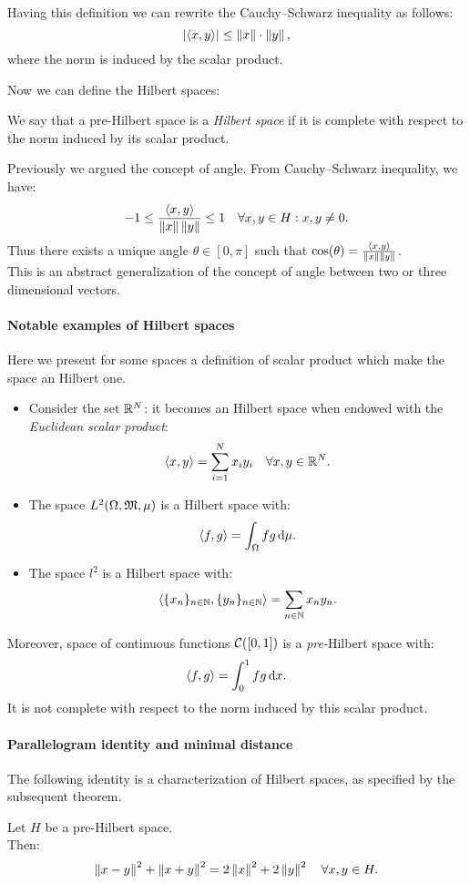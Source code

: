 Having this definition we can rewrite the Cauchy--Schwarz inequality as follows:
$$
\left\lvert \left\langle x,y\right\rangle \right\rvert
\leq \left\lVert x\right\rVert \cdot \left\lVert y\right\rVert
,
$$
where the norm is induced by the scalar product.

Now we can define the Hilbert spaces:

\begin{defn}\label{defn-hilbert-spaces}
	We say that a pre-Hilbert space is a \emph{Hilbert space} if it is complete with respect to the norm induced by its scalar product.
\end{defn}

Previously we argued the concept of angle. From Cauchy--Schwarz inequality, we have:
$$-1 \leq \frac{\left\langle x, y\right\rangle}{\left\lVert x\right\rVert\left\lVert y\right\rVert} \leq 1 \quad \forall x,y \in H: x,y \neq 0.$$
Thus there exists a unique angle $\theta \in [0, \pi]$ such that $\cos(\theta) = \frac{\left\langle x, y\right\rangle}{\left\lVert x\right\rVert\left\lVert y\right\rVert}$.\\
This is an abstract generalization of the concept of angle between two or three dimensional vectors.

\paragraph{Notable examples of Hilbert spaces} Here we present for some spaces a definition of scalar product which make the space an Hilbert one.
\begin{itemize}
	\item Consider the set  $\mathbb R^N$: it becomes an Hilbert space when endowed with the \textit{Euclidean scalar product}:
	$$ 
	\left\langle x, y\right\rangle 
	= \sum^N_{i=1} x_i y_i 
	\quad \forall x, y \in \mathbb R^N
	.
	$$
	\item 	The space $L^2(\Omega, \mathfrak M, \mu)$ is a Hilbert space with:
	$$
	\left\langle f, g\right\rangle 
	= \int_\Omega fg \, \mathrm d \mu
	.
	$$
	\item	The space $l^2$ is a Hilbert space with:
	$$
	\left\langle\{x_n\}_{n\in \mathbb N} , \{y_n\}_{n \in \mathbb N}\right\rangle 
	= \sum_{n \in \mathbb N} x_n y_n
	.
	$$
\end{itemize}

Moreover, space of continuous functions $\mathcal C([0,1])$ is a \textit{pre-}Hilbert space with:
$$
\left\langle f, g\right\rangle 
= \int_0^1 f g \, \mathrm d x
.
$$
It is not complete with respect to the norm induced by this scalar product.


\paragraph{Parallelogram identity and minimal distance} The following identity is a characterization of Hilbert spaces, as specified by the subsequent theorem.
\begin{prop}
	Let $H$ be a pre-Hilbert space.\\
	Then:
	$$
	\left\lVert x-y\right\rVert^2 + \left\lVert x+y\right\rVert^2 
	= 2 \left\lVert x\right\rVert^2 + 2 \left\lVert y\right\rVert^2 
	\quad \forall x, y \in H
	.
	$$
\end{prop}


